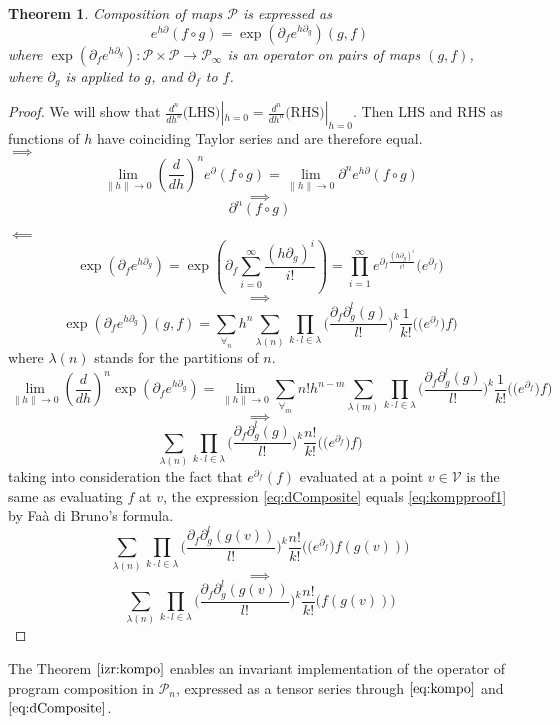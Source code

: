 \documentclass[preprint,12pt]{elsarticle}
\newcommand{\VV}{\mathcal{V}}
\newcommand{\dP}{\mathcal{P}}
\newcommand{\D}{\partial}
\newtheorem{izrek}{Theorem}[section]
\begin{document}
 \begin{izrek}\label{izr:kompo}
 Composition of maps $\dP$ is expressed as
 \begin{equation}\label{eq:kompo}
 e^{h\D}(f\circ g)=\exp(\D_fe^{h\D_g})(g,f)
 \end{equation}
 where $\exp(\D_fe^{h\D_g}):\dP\times\dP\to\dP_\infty$ is an operator on pairs of maps $(g,f)$, where $\D_g$ is applied to $g$, and $\D_f$ to $f$. 
 \end{izrek}
 
\begin{proof}
  We will show that $\frac{d^n}{dh^n}\text{(LHS)}|_{h=0}=\frac{d^n}{dh^n}\text{(RHS)}|_{h=0}$. Then $\text{LHS}$ and $\text{RHS}$ as functions
  of $h$ have coinciding Taylor series and are therefore equal.\\
 $\implies$
 $$\lim\limits_{\lVert h\rVert\to 0}(\frac{d}{dh})^ne^\D(f\circ g)=\lim\limits_{\lVert h\rVert\to 0}\D^ne^{h\D}(f\circ g)$$
 $$\implies$$
 \begin{equation}\label{eq:kompproof1}
 \D^n(f\circ g)
 \end{equation}
 
 $\impliedby$
 $$\exp(\D_fe^{h\D_g})=\exp\left(\D_f\sum\limits_{i=0}^{\infty}\frac{(h\D_g)^i}{i!}\right)=\prod_{i=1}^{\infty}e^{\D_f\frac{(h\D_g)^i}{i!}}\Big(e^{\D_f}\Big)$$
 $$\implies$$
 $$\exp(\D_fe^{h\D_g})(g,f)=\sum\limits_{\forall_n}h^n\sum\limits_{\lambda(n)}\prod\limits_{k\cdot l\in\lambda}\Big(\frac{\D_f\D_g^l(g)}{l!}\Big)^k\frac{1}{k!}\Big(\Big(e^{\D_f}\Big)f\Big)$$
 where $\lambda(n)$ stands for the partitions of $n$.
 $$\lim\limits_{\lVert h\rVert\to 0}(\frac{d}{dh})^n\exp(\D_fe^{h\D_g})=\lim\limits_{\lVert h\rVert\to 0}\sum\limits_{\forall_m}n!h^{n-m}\sum\limits_{\lambda(m)}\prod\limits_{k\cdot l\in\lambda}\Big(\frac{\D_f\D_g^l(g)}{l!}\Big)^k\frac{1}{k!}\Big(\Big(e^{\D_f}\Big)f\Big)$$
 $$\implies$$
 \begin{equation}\label{eq:dComposite}
 \sum\limits_{\lambda(n)}\prod\limits_{k\cdot l\in\lambda}\Big(\frac{\D_f\D_g^l(g)}{l!}\Big)^k\frac{n!}{k!}\Big(\Big(e^{\D_f}\Big)f\Big)
 \end{equation}
 taking into consideration the fact that $e^{\D_f}(f)$ evaluated at a point $v\in \VV$ is the same as evaluating $f$ at $v$, the expression \eqref{eq:dComposite} equals \eqref{eq:kompproof1} by Faà di Bruno's formula.
   $$\sum\limits_{\lambda(n)}\prod\limits_{k\cdot l\in\lambda}\Big(\frac{\D_f\D_g^l(g(v))}{l!}\Big)^k\frac{n!}{k!}\Big(\Big(e^{\D_f}\Big)f(g(v))\Big)$$
   $$\implies$$
   \begin{equation}\label{eq:dCompositePoint}
   \sum\limits_{\lambda(n)}\prod\limits_{k\cdot l\in\lambda}\Big(\frac{\D_f\D_g^l(g(v))}{l!}\Big)^k\frac{n!}{k!}\Big(f(g(v))\Big)
   \end{equation}
 \end{proof}       
 The Theorem $\ref{izr:kompo}$ enables an invariant implementation of the operator of program composition in $\dP_n$, expressed as a tensor series through $\eqref{eq:kompo}$ and $\eqref{eq:dComposite}$. 
 
\end{document}
